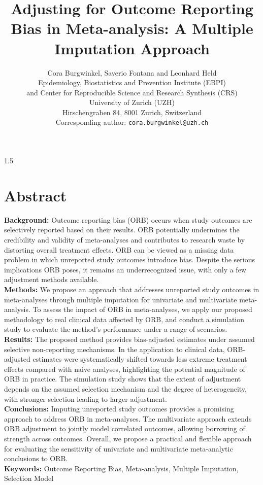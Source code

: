 \documentclass{article}
\title{\bf{Adjusting for Outcome Reporting Bias in Meta-analysis: A Multiple Imputation Approach}}
\author{Cora Burgwinkel, Saverio Fontana and Leonhard Held\\ 
  Epidemiology, Biostatistics
  and Prevention Institute (EBPI)\\ 
  and Center for Reproducible Science and Research Synthesis (CRS) \\
  University of Zurich (UZH)\\ Hirschengraben 84,
  8001 Zurich, Switzerland\\ Corresponding author: \texttt{cora.burgwinkel@uzh.ch}}
\date{}
\begin{document}
\begin{spacing}{1.5}

\maketitle
\linenumbers
\section*{Abstract}

\textbf{Background:} Outcome reporting bias (ORB) occurs when study outcomes are selectively reported based on their results. ORB potentially undermines the credibility and validity of meta-analyses and contributes to research waste by distorting overall treatment effects. ORB can be viewed as a missing data problem in which unreported study outcomes introduce bias. Despite the serious implications ORB poses, it remains an underrecognized issue, with only a few adjustment methods available.\\[.25cm]
\noindent
\textbf{Methods:} We propose an approach that addresses unreported study outcomes in meta-analyses through multiple imputation for univariate and multivariate meta-analysis. To assess the impact of ORB in meta-analyses, we apply our proposed methodology to real clinical data affected by ORB, and conduct a simulation study to evaluate the method's performance under a range of scenarios.\\[.25cm]
\noindent
\textbf{Results:} The proposed method provides bias-adjusted estimates under assumed selective non-reporting mechanisms. In the application to clinical data, ORB-adjusted estimates were systematically shifted towards less extreme treatment effects compared with naive analyses, highlighting the potential magnitude of ORB in practice. The simulation study shows that the extent of adjustment depends on the assumed selection mechanism and the degree of heterogeneity, with stronger selection leading to larger adjustment.\\[.25cm]
\noindent
\textbf{Conclusions:} Imputing unreported study outcomes provides a promising approach to address ORB in meta-analyses. The multivariate approach extends ORB adjustment to jointly model correlated outcomes, allowing borrowing of strength across outcomes. Overall, we propose a practical and flexible approach for evaluating the sensitivity of univariate and multivariate meta-analytic conclusions to ORB.\\[.25cm]
\noindent
\textbf{Keywords:} Outcome Reporting Bias, Meta-analysis, Multiple Imputation, Selection Model


\end{spacing}
\end{document}
